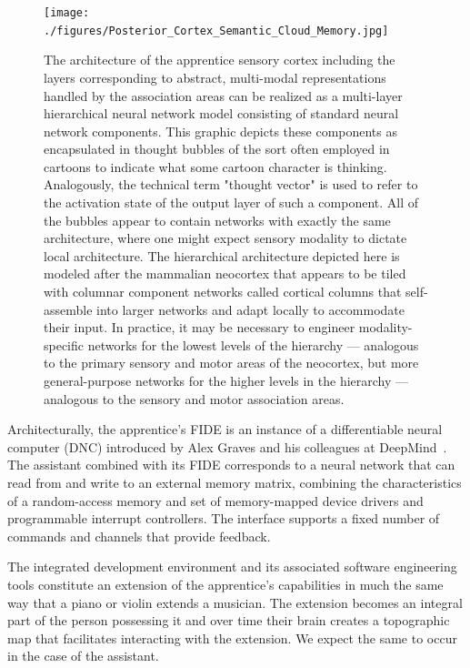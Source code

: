 \documentclass[letterpaper,11pt]{article}
\def\urlh#1{{}}
\def\emdash{---}
\begin{document}
\begin{figure}
%
  \begin{center} 
    \texttt{[image: ./figures/Posterior\_Cortex\_Semantic\_Cloud\_Memory.jpg]} %
  \end{center}
%
  \caption{The architecture of the apprentice sensory cortex including the layers corresponding to abstract, multi-modal representations handled by the association areas can be realized as a multi-layer hierarchical neural network model consisting of standard neural network components. This graphic depicts these components as encapsulated in thought bubbles of the sort often employed in cartoons to indicate what some cartoon character is thinking. Analogously, the technical term "thought vector" is used to refer to the activation state of the output layer of such a component. All of the bubbles appear to contain networks with exactly the same architecture, where one might expect sensory modality to dictate local architecture. The hierarchical architecture depicted here is modeled after the mammalian neocortex that appears to be tiled with columnar component networks called cortical columns that self-assemble into larger networks and adapt locally to accommodate their input. In practice, it may be necessary to engineer modality-specific networks for the lowest levels of the hierarchy \emdash{} analogous to the primary sensory and motor areas of the neocortex, but more general-purpose networks for the higher levels in the hierarchy \emdash{} analogous to the sensory and motor association areas.}
%
  \label{fig_posterior}
%
\end{figure}


Architecturally, the apprentice's FIDE is an instance of a differentiable neural computer (DNC) introduced by Alex Graves and his colleagues at DeepMind~\cite{GravesetalNATURE-16}. The assistant combined with its FIDE corresponds to a neural network that can read from and write to an external memory matrix, combining the characteristics of a random-access memory and set of memory-mapped device drivers and programmable interrupt controllers. The interface supports a fixed number of commands and channels that provide feedback.

The integrated development environment and its associated software engineering tools constitute an extension of the apprentice’s capabilities in much the same way that a piano or violin extends a musician. The extension becomes an integral part of the person possessing it and over time their brain creates a topographic map that facilitates interacting with the extension. We expect the same to occur in the case of the assistant. 
\end{document}
